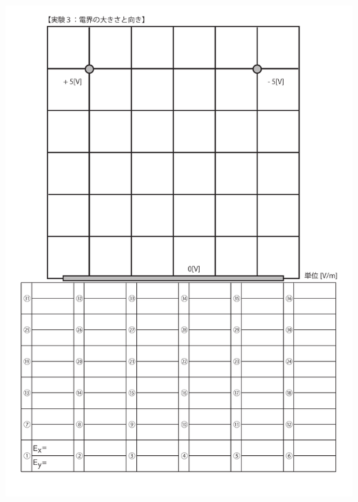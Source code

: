 \documentclass[uplatex,a4paper,11pt,oneside,openany]{jsbook}
\begin{document}
\includegraphics[scale=0.8]{./figure/E10.pdf}

\newpage



\newpage



\newpage



%
%
\end{document}
